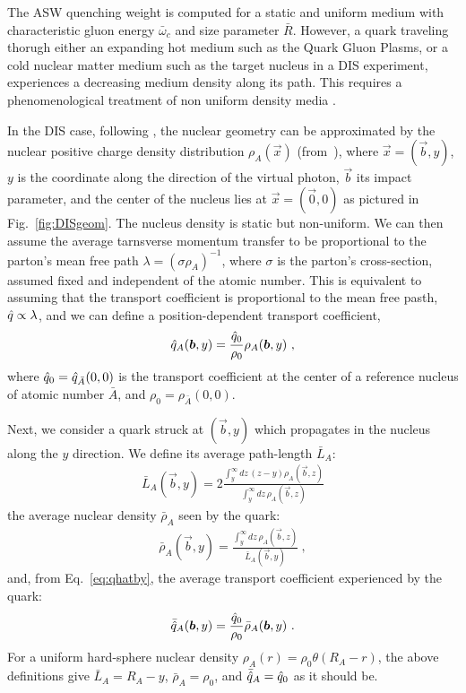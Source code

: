 The ASW quenching weight is computed for a static and uniform 
medium with characteristic gluon energy $\bar\omega_c$ and size parameter 
$\bar R$. However, a quark traveling thorugh either an expanding hot medium such as the Quark Gluon Plasms, or a cold nuclear matter medium such as the target nucleus in a DIS experiment, experiences a decreasing medium density along its path. This requires a phenomenological treatment of non uniform density media \cite{Salgado:2003gb,Dainese:2004te,Accardi:2007in}.

In the DIS case, following \cite{Accardi:2007in}, the nuclear geometry can be approximated by the nuclear positive charge density distribution 
$\rho_A(\vec x)$ (from~\cite{DeJager:1987qc}), where $\vec x=(\vec b,y)$, $y$ 
is the coordinate along the direction of the virtual photon, $\vec b$ its 
impact parameter, and the center of the nucleus lies at $\vec x = (\vec 0,0)$ as pictured in Fig.~\ref{fig:DISgeom}.  
%
The nucleus density is static but non-uniform. We can then assume the average tarnsverse momentum transfer to be proportional to the parton's mean free path $\lambda = (\sigma \rho_A)^{-1}$, where $\sigma$ is the parton's cross-section, assumed fixed and independent of the atomic number. This is equivalent to assuming that the transport coefficient is proportional to the mean free pasth, ${\hat q} \propto \lambda$, and we can define a 
position-dependent transport coefficient,
\begin{align}
  \qhat_A (\vec b,y) = \frac{\qhat_0}{\rho_{0}} \rho_A(\vec b,y) \ ,
 \label{eq:qhatby}
\end{align}
where ${\hat q}_0 = {\hat q}_{\bar A}(0,0)$ is the transport coefficient at the 
center of a reference nucleus of atomic number $\bar A$, and $\rho_{0} = 
\rho_{\bar A}(0,0)$.

Next, we consider a quark struck at $(\vec b,y)$ which propagates in the nucleus along the $y$ direction. We define its average path-length $\bar L_A$:
\begin{align}
  \bar L_A(\vec b,y) = 2 \frac{\int_y^\infty dz\, (z-y)\rho_A(\vec b,z)}
    {\int_y^\infty dz\, \rho_A(\vec b,z)} 
\end{align}
the average nuclear density $\bar\rho_A$ seen by the quark:
\begin{align}
  \bar\rho_A(\vec b,y) =  \frac{\int_y^\infty dz\, \rho_A(\vec b,z)}{\bar 
  L_A(\vec b,y)} \ ,
\end{align}
and, from Eq.~\eqref{eq:qhatby}, the average transport coefficient experienced 
by the quark:
\begin{align}
  \bar\qhat_A (\vec b,y) = \frac{\qhat_0}{\rho_0} \bar\rho_A(\vec b,y) \ .
\end{align}
For a uniform hard-sphere nuclear density $\rho_A(r) = \rho_0 \theta(R_A-r)$, 
the above definitions give $\bar L_A = R_A - y$, $\bar\rho_A = \rho_0$, and 
$\bar{{\hat q}}_A = {\hat q}_0$ as it should be.

